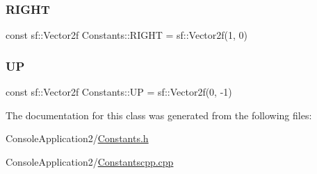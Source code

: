 \hypertarget{class_constants_ae609d0dae2354ed9bd69e1fe8262643e}{}\label{class_constants_ae609d0dae2354ed9bd69e1fe8262643e} 
\subsubsection{\texorpdfstring{R\+I\+G\+HT}{RIGHT}}
{\footnotesize\ttfamily const sf\+::\+Vector2f Constants\+::\+R\+I\+G\+HT = sf\+::\+Vector2f(1, 0)\hspace{0.3cm}{\ttfamily [static]}}

\hypertarget{class_constants_aca8e6566167ac5cefb2f7788dadce9fd}{}\label{class_constants_aca8e6566167ac5cefb2f7788dadce9fd} 
\subsubsection{\texorpdfstring{UP}{UP}}
{\footnotesize\ttfamily const sf\+::\+Vector2f Constants\+::\+UP = sf\+::\+Vector2f(0, -\/1)\hspace{0.3cm}{\ttfamily [static]}}



The documentation for this class was generated from the following files\+:\begin{DoxyCompactItemize}
\item 
Console\+Application2/\hyperlink{_constants_8h}{Constants.\+h}\item 
Console\+Application2/\hyperlink{_constantscpp_8cpp}{Constantscpp.\+cpp}\end{DoxyCompactItemize}
